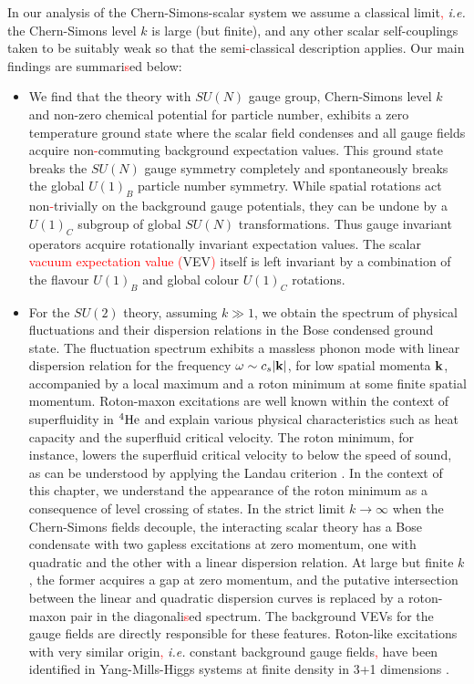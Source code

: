  In our analysis of the Chern-Simons-scalar system we  assume a classical limit\textcolor{red}{,} \textit{i.e.}  the Chern-Simons level $k$ is large (but finite), and any other scalar self-couplings taken to be  suitably weak so that the semi\textcolor{red}{-}classical description applies.  Our main findings are summari\textcolor{red}{s}ed below:
 \begin{itemize}
     \item{We find that the theory with $SU(N)$ gauge group, Chern-Simons level $k$ and non-zero chemical potential for particle number, exhibits a zero temperature ground state where  the scalar field condenses and all gauge fields acquire non\textcolor{red}{-}commuting background expectation values.  This ground state breaks the $SU(N)$ gauge symmetry completely and spontaneously breaks the global $U(1)_B$ particle number symmetry. While spatial rotations act non\textcolor{red}{-}trivially on the background gauge potentials, they  can be undone by a $U(1)_C$ subgroup of global $SU(N)$ transformations.  Thus gauge invariant operators acquire rotationally  invariant expectation values. The scalar \textcolor{red}{vacuum expectation value (}VEV\textcolor{red}{)} itself is left invariant by a combination of the flavour $U(1)_B$ and global colour $U(1)_C$ rotations. }
 \item{For the $SU(2)$ theory, assuming $k\gg 1$, we obtain the spectrum of physical fluctuations and their dispersion relations in the Bose condensed ground state. The fluctuation spectrum exhibits a massless phonon mode with linear dispersion relation 
     for the frequency $\omega\sim c_s |{\bf k}|$, for low spatial momenta ${\bf k}$, accompanied by a local maximum and a roton minimum at some finite spatial momentum.  Roton-maxon excitations are well known within the context of superfluidity in ${}^4{\rm He}$  \cite{Landau:1941vsj, Schmitt:2014eka} and explain various physical characteristics such as heat capacity and the superfluid critical velocity. The roton minimum, for instance, lowers the superfluid critical velocity to below the speed of sound, as can be understood by applying the Landau criterion \cite{Landau:1941vsj, Schmitt:2014eka}. In the context of this chapter, we understand the appearance of the roton minimum as a consequence of level crossing of states. In the strict limit $k\to \infty$ when the Chern-Simons fields decouple, the interacting scalar theory has a Bose condensate with two gapless excitations at zero momentum, one with quadratic and the other with a linear dispersion relation. At  large but finite $k$, the former acquires a gap at zero momentum, and the putative intersection between the linear and quadratic dispersion curves is replaced by a roton-maxon pair in the diagonali\textcolor{red}{s}ed spectrum. The background VEVs for the gauge fields are directly responsible for these features. Roton-like excitations with very similar origin\textcolor{red}{,} \textit{i.e.} constant background gauge fields\textcolor{red}{,} have been identified in Yang-Mills-Higgs systems at finite density in 3+1 dimensions \cite{Gusynin:2003yu}.
 
}
\end{itemize}
